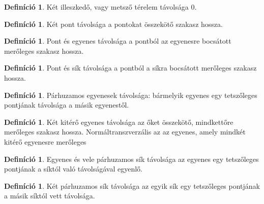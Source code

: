 \documentclass[twoside,12pt]{report}
\theoremstyle{definition}
\newtheorem{definition}[theorem]{Definíció}
\begin{document}
	\begin{definition}
		Két illeszkedő, vagy metsző térelem távolsága 0.
	\end{definition}
	\begin{definition}
		Két pont távolsága a pontokat összekötő szakasz hossza.
	\end{definition}
	\begin{definition}
		Pont és egyenes távolsága a pontból az egyenesre bocsátott merőleges szakasz hossza.
	\end{definition}
	\begin{definition}
		Pont és sík távolsága a pontból a síkra bocsátott merőleges szakasz hossza.
	\end{definition}
	\begin{definition}
		Párhuzamos egyenesek távolsága: bármelyik egyenes egy tetszőleges pontjának távolsága
		a másik egyenestől.
	\end{definition}
	\begin{definition}
		Két kitérő egyenes távolsága az őket összekötő, mindkettőre merőleges szakasz hossza. Normáltranszverzális az az egyenes, amely mindkét kitérő egyenesre merőleges
	\end{definition}
	\begin{definition}
		Egyenes és vele párhuzamos sík távolsága az egyenes egy tetszőleges pontjának
		a síktól való távolságával egyenlő.
	\end{definition}
	\begin{definition}
		Két párhuzamos sík távolsága az egyik sík egy tetszőleges pontjának a másik síktól vett
		távolsága.
	\end{definition}
\end{document}
